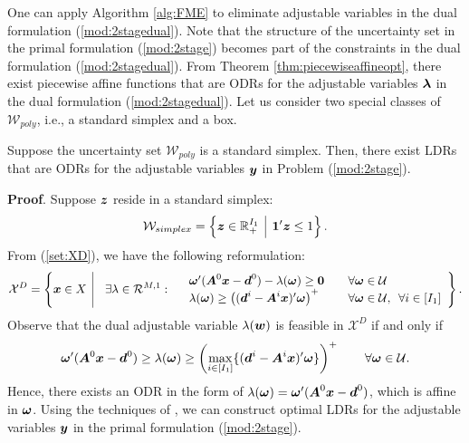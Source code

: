 \documentclass[fleqn,isre,blindrev]{informs4}
\newcommand{\mb}[1]{\mbox{\boldmath \ensuremath{#1}}}
\begin{document}
	One can apply Algorithm \ref{alg:FME} to eliminate adjustable variables in the dual formulation (\ref{mod:2stagedual}). Note that the structure of the uncertainty set in the primal formulation (\ref{mod:2stage}) becomes part of the constraints in the dual formulation (\ref{mod:2stagedual}). From Theorem \ref{thm:piecewiseaffineopt}, there exist piecewise affine functions that are ODRs for the adjustable variables $\mb{\lambda}$ in the dual formulation (\ref{mod:2stagedual}). Let us consider two special classes of $\mathcal{W}_{poly}$, i.e., a standard simplex and a box.
	
	\begin{theorem} \label{thm:optsimplex}
		Suppose the uncertainty set $\mathcal{W}_{poly}$ is a standard simplex. Then, there exist LDRs that are ODRs for the adjustable variables $\mb{y}$ in Problem (\ref{mod:2stage}).
	\end{theorem}
	\textbf{Proof}. Suppose $\mb{z}$ reside in a standard simplex:
\begin{equation*}
	\mathcal{W}_{simplex} = \left\{ \mb{z}\in \mathbb{R}^{I_1}_+ \enskip \vline  \enskip \mb{1}'\mb{z} \le 1 \right\}. 
\end{equation*}
	From (\ref{set:XD}), we have the following reformulation:
\begin{equation*}
		\mathcal{X}^D=  \left\{ \mb{x} \in X \enskip \vline \enskip
		\enskip  \exists  \lambda \in \mathcal{R}^{M,1}: \begin{array}{lll}
			&  \mb{\omega}' (\mb{A}^0\mb{x}-\mb{d}^0) - \lambda(\mb{\omega}) \ge \mb{0}  & \quad \forall \mb{\omega} \in \mathcal{U} \\
			&\lambda(\mb{\omega}) \ge \left( (\mb{d}^i- \mb{A}^i\mb{x})'\mb{\omega}\right)^+   & \quad\forall \mb{\omega} \in \mathcal{U},  \enskip \forall i\in [I_1]
		\end{array}
		\right\}.
\end{equation*}
		Observe that the dual adjustable variable $\lambda(\mb{w})$ is feasible in $\mathcal{X}^D$ if and only if 
\begin{equation*}		\mb{\omega}' (\mb{A}^0\mb{x}-\mb{d}^0) \ge \lambda(\mb{\omega}) \geq \left(\max_{i \in[I_1]}\{(\mb{d}^i- \mb{A}^i\mb{x})'\mb{\omega}\}\right)^+ \qquad \forall \mb{\omega} \in \mathcal{U}.
\end{equation*}
		Hence, there exists an ODR in the form of $\lambda(\mb{\omega}) =  \mb{\omega}' (\mb{A}^0\mb{x}-\mb{d}^0)$, which is affine in $\mb{\omega}$. Using the techniques of \cite[Theorem 2]{bd16}, we can construct optimal LDRs for the adjustable variables $\mb{y}$ in the primal formulation (\ref{mod:2stage}).
	 \hfill \Halmos\\
	
\end{document}

